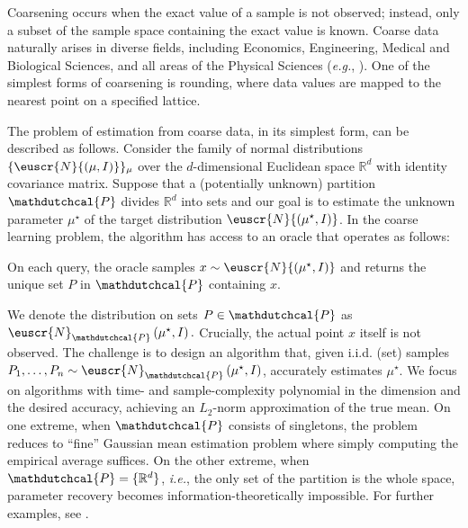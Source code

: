 \documentclass[11pt,letterpaper]{article}
\theoremstyle{plain}
\theoremstyle{definition}
\theoremstyle{remark}
\newcommand{\inparen}[1]{\ensuremath{\left(#1\right)}}
\newcommand{\R}{\mathbb{R}}
\newcommand{\iid}{i.i.d.}
\newcommand{\customcal}[1]{\euscr{#1}}
\newcommand{\cN}{\customcal{N}}
\newcommand{\eg}{\emph{e.g.}}
\newcommand{\ie}{\emph{i.e.}}
\newcommand{\hypo}[1]{\mathdutchcal{#1}}
\newcommand{\hyP}{\hypo{P}}
\newcommand{\normal}[2]{\cN{\inparen{#1,#2}}}
\newcommand{\coarseNormal}[3]{\cN_{#3}\inparen{#1,#2}}
\newcommand{\muStar}{{\mu^\star}}
\begin{document}
Coarsening occurs when the exact value of a sample is not observed; instead, only a subset of the sample space containing the exact value is known.
Coarse data naturally arises in diverse fields, including Economics, Engineering, Medical and Biological Sciences, and all areas of the Physical Sciences 
(\eg{}, \cite{heitjan1990inference,heitjan1991ignorability,heitjan1993ignorability,gostic2020practical,leung1997censoring}). 
One of the simplest forms of coarsening is rounding, where data values are mapped to the nearest point on a specified lattice.  

The problem of estimation from coarse data, in its simplest form, can be described as follows. Consider the family of normal distributions $\{\normal{\mu}{I}\}_{\mu}$  over the $d$-dimensional Euclidean space $\R^d$ with identity covariance matrix. Suppose {that} a  (potentially unknown) partition $\hyP$ {divides} $\R^d$ into sets {and our goal is to estimate the unknown parameter $\muStar$ of the target distribution $\normal{\muStar}{I}$.}
In the coarse learning problem, the  algorithm has access to an oracle that operates as follows:
\begin{center}
    {On each query, the oracle samples $x\sim \normal{\mu^\star}{I}$ and returns the unique set $P$ {in} $\hyP$ containing $x.$}
\end{center}
We denote the distribution on sets $P\in \hyP$ as $\coarseNormal{\mu^\star}{I}{\hyP}.$
Crucially, the {actual} point $x$ itself is not observed.
{The challenge is to design an algorithm that, given \iid{} (set) samples \(P_1, \dots, P_n \sim \coarseNormal{\mu^\star}{I}{\hyP}\), accurately estimates \(\mu^\star\).}
{We focus on algorithms with time- and sample-complexity polynomial in the dimension and the desired accuracy, achieving an \(L_2\)-norm approximation of the true mean.}
On one extreme, when $\hyP$ consists of singletons, 
{the problem reduces to} ``fine'' Gaussian mean estimation problem where simply computing the empirical average {suffices}.
On the other extreme, when $\hyP = \{\R^d\}$, \ie{}, the only set of the partition is the whole space, parameter recovery {becomes} information-theoretically impossible. 
For further examples, see .
\end{document}
